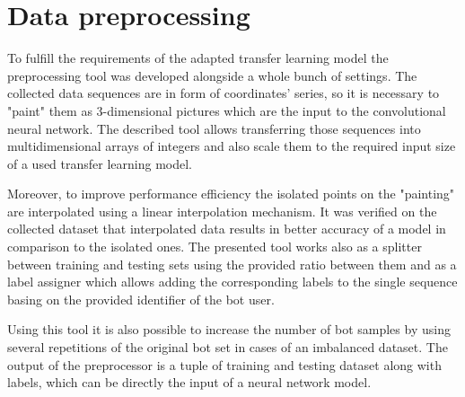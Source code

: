 \section{Data preprocessing}\label{sec:data-preprocessing}
To fulfill the requirements of the adapted transfer learning model the preprocessing tool was developed alongside a whole bunch of settings.
The collected data sequences are in form of coordinates' series, so it is necessary to "paint" them as 3-dimensional pictures which are the input to the convolutional neural network.
The described tool allows transferring those sequences into multidimensional arrays of integers and also scale them to the required input size of a used transfer learning model.

Moreover, to improve performance efficiency the isolated points on the "painting" are interpolated using a linear interpolation mechanism.
It was verified on the collected dataset that interpolated data results in better accuracy of a model in comparison to the isolated ones.
The presented tool works also as a splitter between training and testing sets using the provided ratio between them and as a label assigner which allows adding the corresponding labels to the single sequence basing on the provided identifier of the bot user.

Using this tool it is also possible to increase the number of bot samples by using several repetitions of the original bot set in cases of an imbalanced dataset.
The output of the preprocessor is a tuple of training and testing dataset along with labels, which can be directly the input of a neural network model.